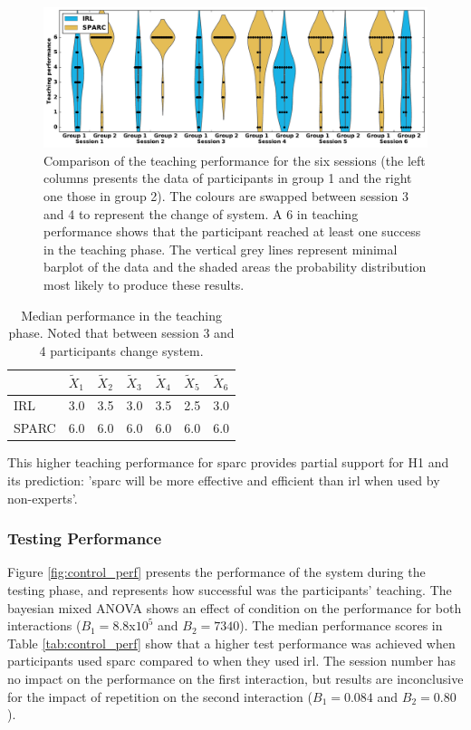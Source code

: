 \begin{figure}[ht]
	\includegraphics[width=\textwidth]{teaching_performance.pdf}
	\centering
	\caption{Comparison of the teaching performance for the six sessions (the left columns presents the data of participants in group 1 and the right one those in group 2). The colours are swapped between session 3 and 4 to represent the change of system. A 6 in teaching performance shows that the participant reached at least one success in the teaching phase. The vertical grey lines represent minimal barplot of the data and the shaded areas the probability distribution most likely to produce these results.
	}
	\label{fig:control_teaching_performance}
\end{figure}

\begin{table}[ht]
	\centering
	\caption{Median performance in the teaching phase. Noted that between session 3 and 4 participants change system.}
	\label{tab:control_teaching_perf}
	\begin{tabular}{@{}lllllll@{}}\toprule
		& $\widetilde{X}_{1}$ & $\widetilde{X}_{2}$ & $\widetilde{X}_{3}$ & $\widetilde{X}_{4}$ & $\widetilde{X}_{5}$ & $\widetilde{X}_{6}$\\ 
		\midrule
		IRL & 3.0 & 3.5 & 3.0 & 3.5 & 2.5 & 3.0\\
		SPARC & 6.0 & 6.0 & 6.0 & 6.0 & 6.0 & 6.0\\
		\bottomrule
	\end{tabular}
\end{table}

This higher teaching performance for \gls{sparc} provides partial support for H1 and its prediction: '\gls{sparc} will be more effective and efficient than \gls{irl} when used by non-experts'.

\subsubsection{Testing Performance}

Figure \ref{fig:control_perf} presents the performance of the system during the testing phase, and represents how successful was the participants' teaching. The bayesian mixed ANOVA shows an effect of condition on the performance for both interactions ($B_1=8.8$x$10^5$ and $B_2 = 7340$). The median performance scores in Table \ref{tab:control_perf} show that a higher test performance was achieved when participants used \gls{sparc} compared to when they used \gls{irl}. The session number has no impact on the performance on the first interaction, but results are inconclusive for the impact of repetition on the second interaction ($B_1=0.084$ and $B_2=0.80$).

